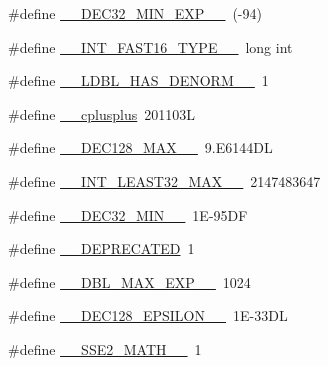 \begin{DoxyCompactItemize}
\#define \hyperlink{build-analizer__host-_desktop___qt__5__9__0___g_c_c__64bit-_release_2moc__predefs_8h_a79e289c54a8c9851b2b118d442bbc26c}{\+\_\+\+\_\+\+D\+E\+C32\+\_\+\+M\+I\+N\+\_\+\+E\+X\+P\+\_\+\+\_\+}~(-\/94)
\item 
\#define \hyperlink{build-analizer__host-_desktop___qt__5__9__0___g_c_c__64bit-_release_2moc__predefs_8h_a6a4d11835d03027f3929b84fe7b55bf6}{\+\_\+\+\_\+\+I\+N\+T\+\_\+\+F\+A\+S\+T16\+\_\+\+T\+Y\+P\+E\+\_\+\+\_\+}~long int
\item 
\#define \hyperlink{build-analizer__host-_desktop___qt__5__9__0___g_c_c__64bit-_release_2moc__predefs_8h_a3c7f3130e367d47bcc27a0a41278155e}{\+\_\+\+\_\+\+L\+D\+B\+L\+\_\+\+H\+A\+S\+\_\+\+D\+E\+N\+O\+R\+M\+\_\+\+\_\+}~1
\item 
\#define \hyperlink{build-analizer__host-_desktop___qt__5__9__0___g_c_c__64bit-_release_2moc__predefs_8h_a1b391bc7ed92f79666c4a5d840aa1edd}{\+\_\+\+\_\+cplusplus}~201103\+L
\item 
\#define \hyperlink{build-analizer__host-_desktop___qt__5__9__0___g_c_c__64bit-_release_2moc__predefs_8h_aaab7817ee2e4bb88b5178e101e7ab2a6}{\+\_\+\+\_\+\+D\+E\+C128\+\_\+\+M\+A\+X\+\_\+\+\_\+}~9.\+E6144\+D\+L
\item 
\#define \hyperlink{build-analizer__host-_desktop___qt__5__9__0___g_c_c__64bit-_release_2moc__predefs_8h_a97e13c059a63d2d547cc4a9f386641d2}{\+\_\+\+\_\+\+I\+N\+T\+\_\+\+L\+E\+A\+S\+T32\+\_\+\+M\+A\+X\+\_\+\+\_\+}~2147483647
\item 
\#define \hyperlink{build-analizer__host-_desktop___qt__5__9__0___g_c_c__64bit-_release_2moc__predefs_8h_a1f993b902b5b1dba7d5b043d0abc347b}{\+\_\+\+\_\+\+D\+E\+C32\+\_\+\+M\+I\+N\+\_\+\+\_\+}~1\+E-\/95\+D\+F
\item 
\#define \hyperlink{build-analizer__host-_desktop___qt__5__9__0___g_c_c__64bit-_release_2moc__predefs_8h_aa806e8f7ce2a8db3bf676735fca2ac51}{\+\_\+\+\_\+\+D\+E\+P\+R\+E\+C\+A\+T\+E\+D}~1
\item 
\#define \hyperlink{build-analizer__host-_desktop___qt__5__9__0___g_c_c__64bit-_release_2moc__predefs_8h_a9a8a7cd9484baf4b72ab15682745d119}{\+\_\+\+\_\+\+D\+B\+L\+\_\+\+M\+A\+X\+\_\+\+E\+X\+P\+\_\+\+\_\+}~1024
\item 
\#define \hyperlink{build-analizer__host-_desktop___qt__5__9__0___g_c_c__64bit-_release_2moc__predefs_8h_abd2230e0e187a5bae549a0ba786b311b}{\+\_\+\+\_\+\+D\+E\+C128\+\_\+\+E\+P\+S\+I\+L\+O\+N\+\_\+\+\_\+}~1\+E-\/33\+D\+L
\item 
\#define \hyperlink{build-analizer__host-_desktop___qt__5__9__0___g_c_c__64bit-_release_2moc__predefs_8h_ad8885a68f76fac734a20349f9b8cac69}{\+\_\+\+\_\+\+S\+S\+E2\+\_\+\+M\+A\+T\+H\+\_\+\+\_\+}~1

\end{DoxyCompactItemize}
